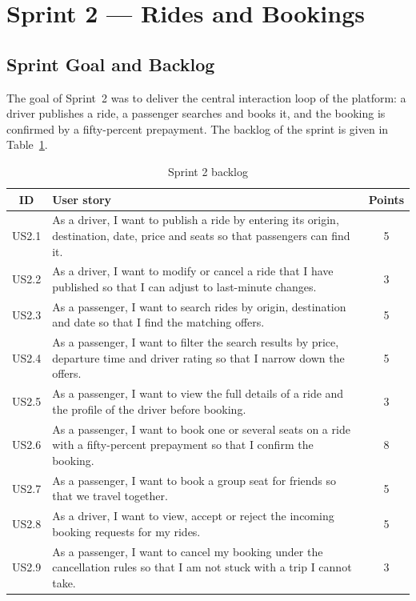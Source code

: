 \section{Sprint 2 --- Rides and Bookings}

\subsection{Sprint Goal and Backlog}

The goal of Sprint~2 was to deliver the central interaction loop of the platform: a driver publishes a ride, a passenger searches and books it, and the booking is confirmed by a fifty-percent prepayment. The backlog of the sprint is given in Table~\ref{tab:sprint2_backlog}.

\begin{table}[H]
\centering
\caption{Sprint 2 backlog}
\label{tab:sprint2_backlog}
\begin{tabular}{|c|p{8.5cm}|c|}
\hline
\textbf{ID} & \textbf{User story} & \textbf{Points} \\
\hline
US2.1 & As a driver, I want to publish a ride by entering its origin, destination, date, price and seats so that passengers can find it. & 5 \\
\hline
US2.2 & As a driver, I want to modify or cancel a ride that I have published so that I can adjust to last-minute changes. & 3 \\
\hline
US2.3 & As a passenger, I want to search rides by origin, destination and date so that I find the matching offers. & 5 \\
\hline
US2.4 & As a passenger, I want to filter the search results by price, departure time and driver rating so that I narrow down the offers. & 5 \\
\hline
US2.5 & As a passenger, I want to view the full details of a ride and the profile of the driver before booking. & 3 \\
\hline
US2.6 & As a passenger, I want to book one or several seats on a ride with a fifty-percent prepayment so that I confirm the booking. & 8 \\
\hline
US2.7 & As a passenger, I want to book a group seat for friends so that we travel together. & 5 \\
\hline
US2.8 & As a driver, I want to view, accept or reject the incoming booking requests for my rides. & 5 \\
\hline
US2.9 & As a passenger, I want to cancel my booking under the cancellation rules so that I am not stuck with a trip I cannot take. & 3 \\
\hline
\end{tabular}
\end{table}


